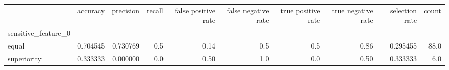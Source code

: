 \begin{tabular}{lrrrrrrrrr}
\toprule
{} &  accuracy &  precision &  recall &  false positive rate &  false negative rate &  true positive rate &  true negative rate &  selection rate &  count \\
sensitive\_feature\_0 &           &            &         &                      &                      &                     &                     &                 &        \\
\midrule
equal               &  0.704545 &   0.730769 &     0.5 &                 0.14 &                  0.5 &                 0.5 &                0.86 &        0.295455 &   88.0 \\
superiority         &  0.333333 &   0.000000 &     0.0 &                 0.50 &                  1.0 &                 0.0 &                0.50 &        0.333333 &    6.0 \\
\bottomrule
\end{tabular}
